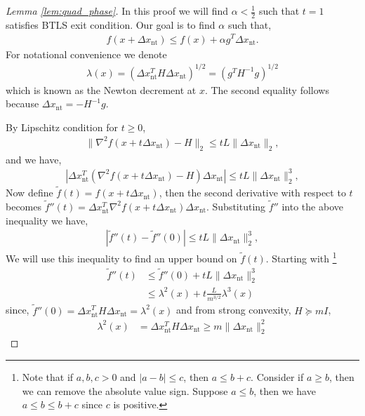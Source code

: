 \documentclass[12pt]{report}
\begin{document}
\begin{proof}[Lemma \ref{lem:quad_phase}]
In this proof we will find $\alpha<\frac{1}{2}$ such that $t=1$ satisfies BTLS exit condition. Our goal is to find $\alpha$ such that,
\begin{align}
f(x+\Delta x_{\mathrm{nt}}) \le f(x) + \alpha g^T \Delta x_{\mathrm{nt}}.
\end{align}
For notational convenience we denote
\begin{align}
\lambda(x) = (\Delta x_{\mathrm{nt}}^T H \Delta x_{\mathrm{nt}})^{1/2}= (g^T H^{-1} g )^{1/2}
\end{align}
which is known as the Newton decrement at $x$. The second equality follows because $\Delta x_{\mathrm{nt}} = -H^{-1}g $.

By Lipschitz condition for $t\ge 0$,
\begin{align}
\|\nabla^2f(x+t \Delta x_{\mathrm{nt}}) - H \|_2 \le t L \|\Delta x_{\mathrm{nt}}\|_2,
\end{align}
and we have,
\begin{align}
|\Delta x_{\mathrm{nt}}^T (\nabla^2f(x+t \Delta x_{\mathrm{nt}}) - H) \Delta x_{\mathrm{nt}} | \le t L \|\Delta x_{\mathrm{nt}}\|_2^3,
\end{align}
Now define $\tilde{f}(t) = f(x+t \Delta x_{\mathrm{nt}})$, then the second derivative with respect to $t$ becomes $\tilde{f}''(t) = \Delta x_{\mathrm{nt}}^T \nabla^2 f(x+t\Delta x_{\mathrm{nt}}) \Delta x_{\mathrm{nt}}$. Substituting $\tilde{f}''$ into the above inequality we have,
\begin{align}
|\tilde{f}''(t) - \tilde{f}''(0) | \le t L \|\Delta x_{\mathrm{nt}}\|_2^3,
\end{align}
We will use this inequality to find an upper bound on $\tilde{f}(t)$. Starting with \footnote{Note that if $a,b,c > 0$ and $|a-b| \leq c$, then $a \leq b + c$.  Consider if $a \geq b$, then we can remove the absolute value sign.  Suppose $a \leq b$, then we have $a \leq b \leq b+c$ since $c$ is positive.}
\begin{align}
\tilde{f}''(t) & \le \tilde{f}''(0) + t L \|\Delta x_{\mathrm{nt}}\|_2^3
\\ & \le \lambda^2(x) + t \frac{L}{m^{3/2}} \lambda^3(x)
\label{eq:nd_der_f_tilde}
\end{align}
since, $\tilde{f}''(0)=\Delta x_{\mathrm{nt}}^T H \Delta x_{\mathrm{nt}}=\lambda^2(x)$ and from strong convexity, $H\succeq m I$, 
\begin{align*}
\lambda^2(x) & = \Delta x_{\mathrm{nt}}^T H \Delta x_{\mathrm{nt}} \ge m \|\Delta x_{\mathrm{nt}} \|_2^2

\end{align*}
\end{proof}
\end{document}
